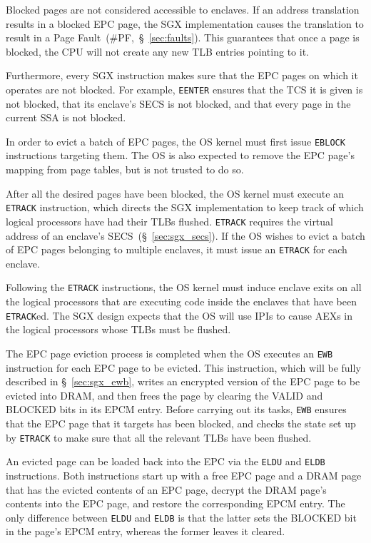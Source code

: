 Blocked pages are not considered accessible to enclaves. If an address
translation results in a blocked EPC page, the SGX implementation causes the
translation to result in a Page Fault~(\#PF,~\S~\ref{sec:faults}). This
guarantees that once a page is blocked, the CPU will not create any new TLB
entries pointing to it.

Furthermore, every SGX instruction makes sure that the EPC pages on which it
operates are not blocked. For example, \texttt{EENTER} ensures that the TCS
it is given is not blocked, that its enclave's SECS is not blocked, and that
every page in the current SSA is not blocked.


In order to evict a batch of EPC pages, the OS kernel must first issue
\texttt{EBLOCK} instructions targeting them. The OS is also expected to remove
the EPC page's mapping from page tables, but is not trusted to do so.

After all the desired pages have been blocked, the OS kernel must execute an
\texttt{ETRACK} instruction, which directs the SGX implementation to keep track
of which logical processors have had their TLBs flushed. \texttt{ETRACK}
requires the virtual address of an enclave's SECS~(\S~\ref{sec:sgx_secs}). If
the OS wishes to evict a batch of EPC pages belonging to multiple enclaves, it
must issue an \texttt{ETRACK} for each enclave.

Following the \texttt{ETRACK} instructions, the OS kernel must induce enclave
exits on all the logical processors that are executing code inside the enclaves
that have been \texttt{ETRACK}ed. The SGX design expects that the OS will use
IPIs to cause AEXs in the logical processors whose TLBs must be flushed.

The EPC page eviction process is completed when the OS executes an \texttt{EWB}
instruction for each EPC page to be evicted. This instruction, which will be
fully described in \S~\ref{sec:sgx_ewb}, writes an encrypted version of the EPC
page to be evicted into DRAM, and then frees the page by clearing the VALID and
BLOCKED bits in its EPCM entry. Before carrying out its tasks, \texttt{EWB}
ensures that the EPC page that it targets has been blocked, and checks the
state set up by \texttt{ETRACK} to make sure that all the relevant TLBs have
been flushed.

An evicted page can be loaded back into the EPC via the \texttt{ELDU} and
\texttt{ELDB} instructions. Both instructions start up with a free EPC page and
a DRAM page that has the evicted contents of an EPC page, decrypt the DRAM
page's contents into the EPC page, and restore the corresponding EPCM entry.
The only difference between \texttt{ELDU} and \texttt{ELDB} is that the latter
sets the BLOCKED bit in the page's EPCM entry, whereas the former leaves it
cleared.


